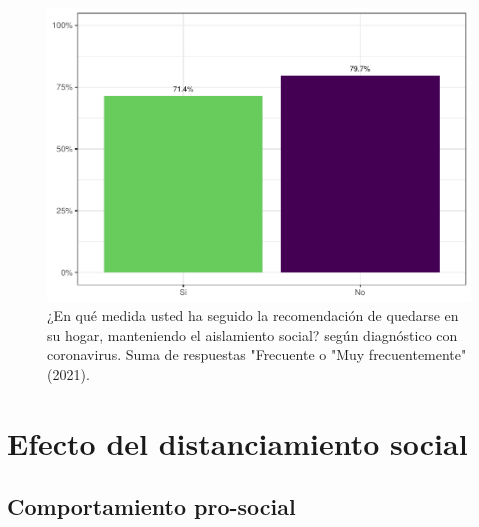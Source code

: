 \documentclass[
  12pt,
]{book}
\begin{document}
\begin{figure}

{\centering \includegraphics{reporte-elsoc_files/figure-latex/dist-covid-1} 

}

\caption{¿En qué medida usted ha seguido la recomendación de quedarse en su hogar, manteniendo el aislamiento social? según diagnóstico con coronavirus. Suma de respuestas "Frecuente o "Muy frecuentemente" (2021).}\label{fig:dist-covid}
\end{figure}

\hypertarget{efecto-del-distanciamiento-social}{%
\section{Efecto del distanciamiento social}\label{efecto-del-distanciamiento-social}}

\hypertarget{comportamiento-pro-social}{%
\subsection{Comportamiento pro-social}\label{comportamiento-pro-social}}
\end{document}
